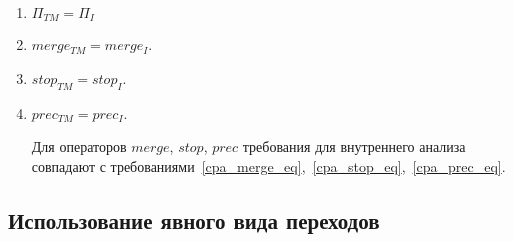 \begin{enumerate}
\begin{proof}
Действительно, рассмотрим случайный переход $\tau \tcarrow \tau'$, $\tau \in \conc{R}$.
Нужно показать, что $\exists k: tau' \in Reach^k(R)$.
Так как $\tau \in \conc{R}$ по определению $\conc{R}$~\ref{cpa_conc_tm_def} это означает, что $\exists t, t_1, \dots, t_n \in T, t_i \neq t_j, e_0, e_1, \dots, e_n \in R:$\\
$\tau \in \epp_I
\left(
\begin{pmatrix}
e_0 \\
t_0 
\end{pmatrix},
\left\{
\begin{pmatrix}
e_1 \\
t_1 
\end{pmatrix} ,
\dots ,
\begin{pmatrix}
e_n \\
t_n 
\end{pmatrix}
\right\}
\right)$.

По условию на внутренние операторы~\ref{cpa_transfer_inner_req} это означает, что найдутся такие элементы $e'_0, e'_1, \dots, e'_n \in E$, которые могут быть получены за два шага: 
\begin{enumerate}
\item применение оператора $transfer$ и оператора $apply$ для перехода в текущем потоке;
\item применение оператора $transfer$ к переходам в окружении, которые были получены на предудыщем шаге с помощью оператора $apply$.
\end{enumerate}
\end{proof}
И для этих элементов $e'_0, e'_1, \dots, e'_n$ будет выполнено $\tau' \in \epp_I((e_i', t_i), \{(e_0', t_0), \dots, (e_n', t_n)\})$.
То есть, показано, что $\exists k=2: \tau' \in Reach^k(R)$.

\item $\Pi_{TM} = \Pi_{I}$
\item $merge_{TM} = merge_{I}$.
\item $stop_{TM} = stop_{I}$.
\item $prec_{TM} = prec_{I}$.

Для операторов $merge$, $stop$, $prec$ требования для внутреннего анализа совпадают с требованиями~\ref{cpa_merge_eq},~\ref{cpa_stop_eq},~\ref{cpa_prec_eq}.
\end{enumerate}

\subsection{Использование явного вида переходов}
\label{subsect_transitions}

